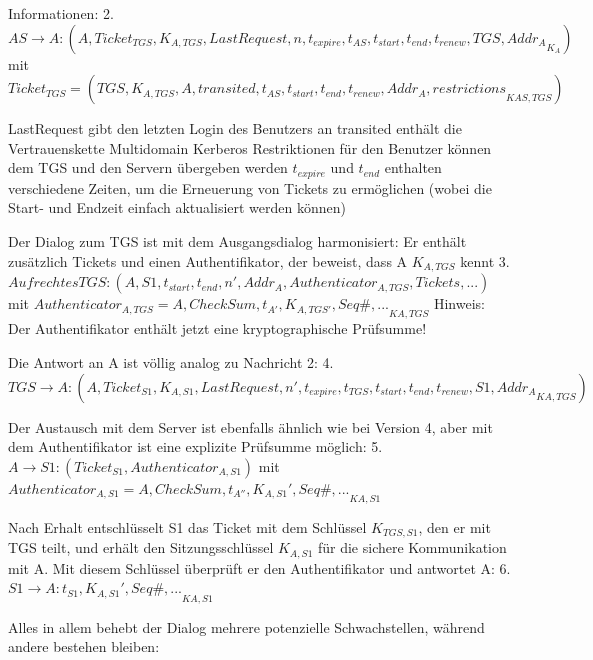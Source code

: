 \documentclass[a4paper]{article}
\begin{document}
\begin{multicols}{3}
\begin{itemize*}
            Informationen: 2. $AS\rightarrow A: (A,Ticket_{TGS},{K_{A,TGS}, LastRequest,n,t_{expire},t_{AS},t_{start},t_{end},t_{renew},TGS, Addr_A}_{K_A})$ mit $Ticket_{TGS}=(TGS, {K_{A,TGS},A,transited, t_{AS}, t_{start},t_{end},t_{renew},Addr_A,restrictions}_{{K}{AS,TGS}})$
            \begin{itemize*}
                  \item LastRequest gibt den letzten Login des Benutzers an transited enthält die Vertrauenskette Multidomain Kerberos Restriktionen für den Benutzer können dem TGS und den Servern übergeben werden $t_{expire}$ und $t_{end}$ enthalten verschiedene Zeiten, um die Erneuerung von Tickets zu ermöglichen (wobei die Start- und Endzeit einfach aktualisiert werden können)
            \end{itemize*}
            \item Der Dialog zum TGS ist mit dem Ausgangsdialog harmonisiert: Er enthält zusätzlich Tickets und einen Authentifikator, der beweist, dass A $K_{A,TGS}$ kennt 3. $Aufrechtes TGS:(A,S1,t_{start},t_{end},n',Addr_A,Authenticator_{A,TGS}, Tickets,...)$ mit $Authenticator_{A,TGS}={A, CheckSum, t_{A'}, K_{A,TGS'}, Seq\#,...}_{{K}{A,TGS}}$ Hinweis:
            Der Authentifikator enthält jetzt eine kryptographische Prüfsumme!
            \item Die Antwort an A ist völlig analog zu Nachricht 2: 4.
            $TGS\rightarrow
                  A:(A,Ticket_{S1},{K_{A,S1},LastRequest,
                  n',t_{expire},t_{TGS},t_{start},t_{end},t_{renew},S1,Addr_A}_{{K}{A,TGS}})$
            \item Der Austausch mit dem Server ist ebenfalls ähnlich wie bei Version 4,
            aber mit dem Authentifikator ist eine explizite Prüfsumme möglich: 5.
            $A\rightarrow S1:(Ticket_{S1},
                  Authenticator_{A,S1})$ mit
            $Authenticator_{A,S1}={A,CheckSum,t_{A''},K_{A,S1}', Seq\#,
                  ...}_{{K}{A,S1}}$
            \item Nach Erhalt entschlüsselt S1 das Ticket mit dem Schlüssel
            $K_{TGS,S1}$, den er mit TGS teilt, und erhält den
            Sitzungsschlüssel $K_{A,S1}$ für die sichere Kommunikation mit A.
            Mit diesem Schlüssel überprüft er den Authentifikator und antwortet A:
            6. $S1\rightarrow
                  A:{t_{S1},K_{A,S1}',Seq\#,...}_{{K}{A,S1}}$
            \item Alles in allem behebt der Dialog mehrere potenzielle Schwachstellen,
            während andere bestehen bleiben:

\end{itemize*}
\end{multicols}
\end{document}
